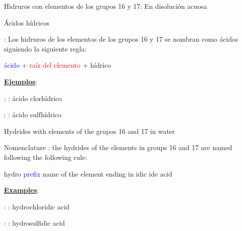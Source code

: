 \documentclass{beamer}
\begin{document}
\begin{frame}[t]{Hidruros con elementos de los grupos 16 y 17: En disolución acuosa}
    \begin{block}{\Large Ácidos hídricos}\vspace*{5pt}

        \textbf{}: Los hidruros de los elementos de los grupos 16 y 17 se nombran como ácidos siguiendo la siguiente regla:
        \begin{center}
            \textcolor{blue}{ácido} + \textcolor{red}{raíz del elemento} + \textcolor{green!50!black}{hídrico}
        \end{center}

        \textbf{\uline{Ejemplos}}:

         : : ácido clorhídrico

         : : ácido sulfhídrico
    \end{block}
\end{frame}

\begin{frame}[t]{ Hydrides with elements of the grupos 16 and 17 in water}\vspace{10pt}
    
    \begin{alertblock}{\Large Nomenclature}\vspace*{6pt}
            \textbf{}: the hydrides of the elements in groups 16 and 17 are named following the following rule:
                  \begin{center}
                    \textcolor{green!50!black}{hydro} \textcolor{blue}{prefix}  \textcolor{azulF}{name of the element ending in idic} \textcolor{green!50!black}{ide}  acid 
                  \end{center}


                  \textbf{\uline{Examples}}:

                   : : hydrochloridic acid

                   : : hydrosulfidic acid
    \end{alertblock}
\end{frame}
\end{document}
